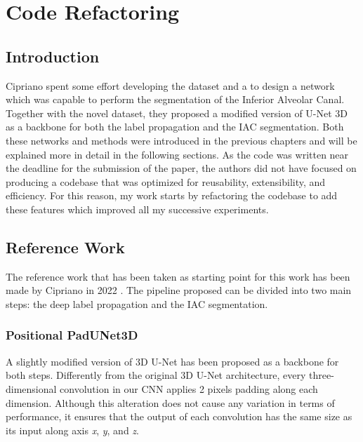 
\chapter{Code Refactoring}

\label{chp:refwork}

\def\:{\hskip0pt} %
\section{Introduction}
Cipriano \etal spent some effort developing the dataset and a to design a
network which was capable to perform the segmentation of the Inferior Alveolar
Canal.
Together with the novel dataset, they proposed a modified version of
U-Net 3D as a backbone for both the label propagation and the IAC segmentation.
Both these networks and methods were introduced in the previous
chapters and will be explained more in detail in the following sections.
As the code was written near the deadline for the submission of the paper,
the authors did not have focused on producing a codebase that was optimized for
reusability, extensibility, and efficiency.
For this reason, my work starts by refactoring the codebase to add these features
which improved all my successive experiments.

\section{Reference Work}
The reference work that has been taken as starting point for this work has been
made by Cipriano \etal in 2022 \cite{cipriano2022improving}.
The pipeline proposed can be divided into two main steps: the deep label
propagation and the IAC segmentation.

\subsection{Positional PadUNet3D}
A slightly modified version of 3D U-Net has been proposed as a backbone for both
steps. Differently from the original 3D U-Net architecture, every
three-dimensional convolution in our CNN applies 2 pixels padding along each
dimension. Although this alteration does not cause any variation in terms of
performance, it ensures that the output of each convolution has the same size as
its input along axis \emph{x}, \emph{y}, and \emph{z}.

